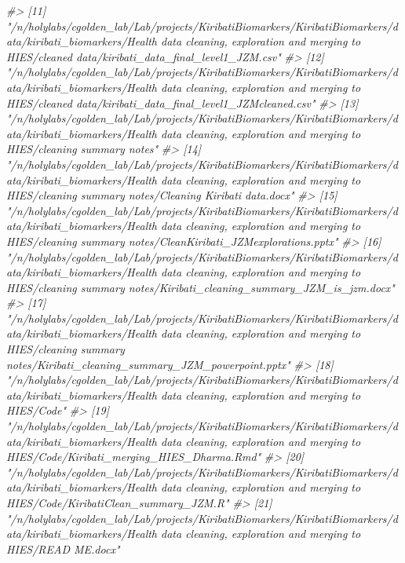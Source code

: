 \documentclass[]{article}
\newenvironment{Shaded}{\begin{snugshade}}{\end{snugshade}}
\newcommand{\CommentTok}[1]{\textcolor[rgb]{0.56,0.35,0.01}{\textit{#1}}}
\begin{document}
\begin{Shaded}
\begin{Highlighting}[]
\CommentTok{#> [11] "/n/holylabs/cgolden_lab/Lab/projects/KiribatiBiomarkers/KiribatiBiomarkers/data/kiribati_biomarkers/Health data cleaning, exploration and merging to HIES/cleaned data/kiribati_data_final_level1_JZM.csv"                     }
\CommentTok{#> [12] "/n/holylabs/cgolden_lab/Lab/projects/KiribatiBiomarkers/KiribatiBiomarkers/data/kiribati_biomarkers/Health data cleaning, exploration and merging to HIES/cleaned data/kiribati_data_final_level1_JZMcleaned.csv"              }
\CommentTok{#> [13] "/n/holylabs/cgolden_lab/Lab/projects/KiribatiBiomarkers/KiribatiBiomarkers/data/kiribati_biomarkers/Health data cleaning, exploration and merging to HIES/cleaning summary notes"                                              }
\CommentTok{#> [14] "/n/holylabs/cgolden_lab/Lab/projects/KiribatiBiomarkers/KiribatiBiomarkers/data/kiribati_biomarkers/Health data cleaning, exploration and merging to HIES/cleaning summary notes/Cleaning Kiribati data.docx"                  }
\CommentTok{#> [15] "/n/holylabs/cgolden_lab/Lab/projects/KiribatiBiomarkers/KiribatiBiomarkers/data/kiribati_biomarkers/Health data cleaning, exploration and merging to HIES/cleaning summary notes/CleanKiribati_JZMexplorations.pptx"           }
\CommentTok{#> [16] "/n/holylabs/cgolden_lab/Lab/projects/KiribatiBiomarkers/KiribatiBiomarkers/data/kiribati_biomarkers/Health data cleaning, exploration and merging to HIES/cleaning summary notes/Kiribati_cleaning_summary_JZM_is_jzm.docx"    }
\CommentTok{#> [17] "/n/holylabs/cgolden_lab/Lab/projects/KiribatiBiomarkers/KiribatiBiomarkers/data/kiribati_biomarkers/Health data cleaning, exploration and merging to HIES/cleaning summary notes/Kiribati_cleaning_summary_JZM_powerpoint.pptx"}
\CommentTok{#> [18] "/n/holylabs/cgolden_lab/Lab/projects/KiribatiBiomarkers/KiribatiBiomarkers/data/kiribati_biomarkers/Health data cleaning, exploration and merging to HIES/Code"                                                                }
\CommentTok{#> [19] "/n/holylabs/cgolden_lab/Lab/projects/KiribatiBiomarkers/KiribatiBiomarkers/data/kiribati_biomarkers/Health data cleaning, exploration and merging to HIES/Code/Kiribati_merging_HIES_Dharma.Rmd"                               }
\CommentTok{#> [20] "/n/holylabs/cgolden_lab/Lab/projects/KiribatiBiomarkers/KiribatiBiomarkers/data/kiribati_biomarkers/Health data cleaning, exploration and merging to HIES/Code/KiribatiClean_summary_JZM.R"                                    }
\CommentTok{#> [21] "/n/holylabs/cgolden_lab/Lab/projects/KiribatiBiomarkers/KiribatiBiomarkers/data/kiribati_biomarkers/Health data cleaning, exploration and merging to HIES/READ ME.docx"                                                        }

\end{Highlighting}
\end{Shaded}
\end{document}
